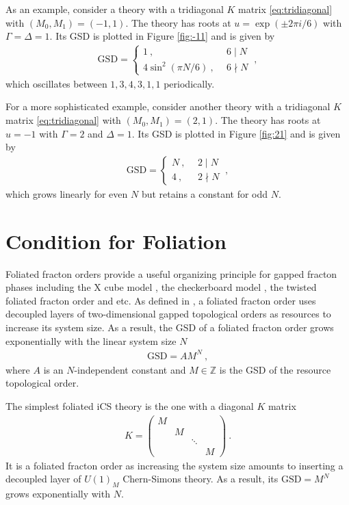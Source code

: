 \documentclass[aps,prb,twocolumn,superscriptaddress,floatfix,10pt,nofootinbib]{revtex4-2}
\newcommand{\ie}{\begin{equation}\begin{aligned}}
\newcommand{\fe}{\end{aligned}\end{equation}}
\theoremstyle{definition}
\begin{document}
As an example, consider a theory with a tridiagonal $K$ matrix \eqref{eq:tridiagonal} with $(M_0,M_1)=(-1,1)$. The theory has roots at $u=\exp(\pm 2\pi i/6)$ with $\Gamma=\Delta=1$. Its GSD is plotted in Figure \ref{fig:-11} and is given by
\ie
\text{GSD}=\begin{cases}
1~,\ \ &6\mid N
\\
4\sin^2(\pi N/6)~,\ \ &6\nmid N
\end{cases}~,
\fe
which oscillates between $1,3,4,3,1,1$ periodically.

For a more sophisticated example, consider another theory with a tridiagonal $K$ matrix \eqref{eq:tridiagonal} with $(M_0,M_1)=(2,1)$. The theory has roots at $u=-1$ with $\Gamma=2$ and $\Delta=1$. Its GSD is plotted in Figure \ref{fig:21} and is given by
\ie
\text{GSD}=\begin{cases}
N~,\ \ &2\mid N
\\
4~,\ \ &2\nmid N
\end{cases}~,
\fe
which grows linearly for even $N$ but retains a constant for odd $N$.


\section{Condition for Foliation}\label{sec:foliation}

Foliated fracton orders \cite{Shirley:2017suz} provide a useful organizing principle for gapped fracton phases including the X cube model \cite{Vijay:2016phm}, the checkerboard model \cite{Vijay:2016phm,Shirley:2018hkm}, the twisted foliated fracton order \cite{Shirley_2020} and etc. As defined in \cite{Shirley:2017suz}, a foliated fracton order uses decoupled layers of two-dimensional gapped topological orders as resources to increase its system size. As a result, the GSD of a foliated fracton order grows exponentially with the linear system size $N$
\ie\label{eq:foliated_GSD}
\text{GSD}=A M^N~,
\fe
where $A$ is an $N$-independent constant and $M\in\mathbb{Z}$ is the GSD of the resource topological order. 

The simplest foliated iCS theory is the one with a diagonal $K$ matrix 
\ie\label{eq:diagonal}
K=\left(
\begin{array}{ccccc}
M
\\
&M\\
&&\ddots\\
&&&M
\end{array}
\right)~.
\fe 
It is a foliated fracton order as increasing the system size amounts to inserting a decoupled layer of $U(1)_M$ Chern-Simons theory. As a result, its $\text{GSD}=M^N$ grows exponentially with $N$. 
\end{document}
